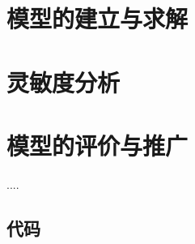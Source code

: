 \documentclass{cumcmthesis}
\begin{document}
\section{模型的建立与求解}

\section{灵敏度分析}

\section{模型的评价与推广}

\begin{thebibliography}{99}%

     ....

\end{thebibliography}

\begin{appendices}

\section{代码}
%

\end{appendices}
\end{document}
